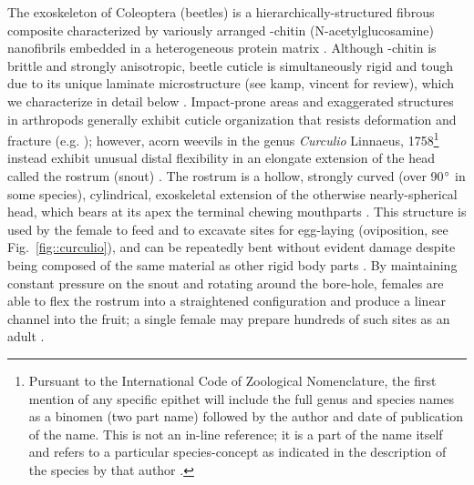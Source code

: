 \documentclass[twocolumn, linenumbers, superscriptaddress, nofootinbib]{revtex4-1}
\begin{document}
	The exoskeleton of Coleoptera (beetles) is a hierarchically-structured fibrous composite characterized by variously arranged \textalpha-chitin (N-acetylglucosamine) nanofibrils embedded in a heterogeneous protein matrix \cite{Hepburn1973, Jansen2016, Vincent2004}.
	Although \textalpha-chitin is brittle and strongly anisotropic, beetle cuticle is simultaneously rigid and tough due to its unique laminate microstructure (see kamp, vincent for review), which we characterize in detail below \cite{Kamp2010, Kamp2015, Neville1976}.
	Impact-prone areas and exaggerated structures in arthropods generally exhibit cuticle organization that resists deformation and fracture (e.g. \cite{Amini2015, Mccullough2014mech, Mccullough2014struc, Dirks2012, Dirks2013}); however, acorn weevils in the genus \textit{Curculio} Linnaeus, 1758\footnote{
		Pursuant to the International Code of Zoological Nomenclature, the first mention of any specific epithet will include the full genus and species names as a binomen (two part name) followed by the author and date of publication of the name.
		This is not an in-line reference; it is a part of the name itself and refers to a particular species-concept as indicated in the description of the species by that author \cite{ICZN1999}.}
	instead exhibit unusual distal flexibility in an elongate extension of the head called the rostrum (snout) \cite{Toju2005, Jansen2016, Singh2016, Gibson1969}.
	The rostrum is a hollow, strongly curved (over 90$\degree$ in some species), cylindrical, exoskeletal extension of the otherwise nearly-spherical head, which bears at its apex the terminal chewing mouthparts \cite{Morimoto2003, Ting1933, Ting1936, Dennell1942, Gibson1969}.
	This structure is used by the female to feed and to excavate sites for egg-laying (oviposition, see Fig.~\ref{fig::curculio}), and can be repeatedly bent without evident damage despite being composed of the same material as other rigid body parts \cite{Jansen2016, Singh2016, Gibson1969, Toju2005}.
	By maintaining constant pressure on the snout and rotating around the bore-hole, females are able to flex the rostrum into a straightened configuration and produce a linear channel into the fruit; a single female may prepare hundreds of such sites as an adult \cite{Toju2005, Moffett1989, AguirreUribe1978}.
	
\end{document}
